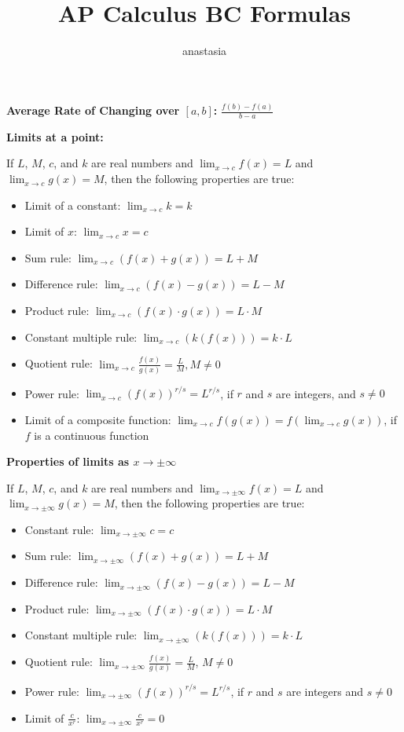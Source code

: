 \documentclass[10pt,a4paper,oneside]{book}
\title{AP Calculus BC Formulas}
\author{anastasia}
\begin{document}
\maketitle

\textbf{Average Rate of Changing over $[a,b]$:} $\frac{f(b)-f(a)}{b-a}$

\textbf{Limits at a point:}

If $L$, $M$, $c$, and $k$ are real numbers and $\lim_{x\to c} f(x) = L$ and $\lim_{x\to c}g(x) = M$, then the following properties are true:
\begin{itemize}
    \item Limit of a constant: $\lim_{x\to c}k=k$
    \item Limit of $x$: $\lim_{x\to c}x=c$
    \item Sum rule: $\lim_{x\to c}(f(x)+g(x))=L+M$
    \item Difference rule: $\lim_{x\to c}(f(x)-g(x))=L-M$
    \item Product rule: $\lim_{x\to c}(f(x)\cdot g(x))=L\cdot M$
    \item Constant multiple rule: $\lim_{x\to c}(k(f(x)))=k\cdot L$
    \item Quotient rule: $\lim_{x\to c}\frac{f(x)}{g(x)}=\frac{L}{M}, M\neq 0$
    \item Power rule: $\lim_{x\to c}(f(x))^{r/s}=L^{r/s}$, if $r$ and $s$ are integers, and $s\neq 0$
    \item Limit of a composite function: $\lim_{x\to c}f(g(x))=f(\lim_{x\to c}g(x))$, if $f$ is a continuous function
\end{itemize}

\textbf{Properties of limits as $x\rightarrow \pm \infty$}

If $L$, $M$, $c$, and $k$ are real numbers and $\lim_{x\to \pm\infty}f(x)=L$ and $\lim_{x\to \pm\infty}g(x)=M$, then the following properties are true:
\begin{itemize}
    \item Constant rule: $\lim_{x\to\pm\infty}c=c$
    \item Sum rule: $\lim_{x\to\pm\infty}(f(x)+g(x))=L+M$
    \item Difference rule: $\lim_{x\to\pm\infty}(f(x)-g(x))=L-M$
    \item Product rule: $\lim_{x\to\pm\infty}(f(x)\cdot g(x))=L\cdot M$
    \item Constant multiple rule: $\lim_{x\to\pm\infty}(k(f(x)))= k\cdot L$
    \item Quotient rule: $\lim_{x\to\pm\infty}\frac{f(x)}{g(x)}=\frac{L}{M}$, $M\neq 0$
    \item Power rule: $\lim_{x\to\pm\infty}(f(x))^{r/s}=L^{r/s}$, if $r$ and $s$ are integers and $s\neq 0$
    \item Limit of $\frac{c}{x^r}$: $\lim_{x\to\pm\infty}\frac{c}{x^r}=0$
\end{itemize}
\end{document}
